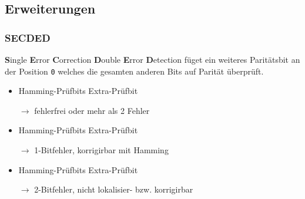 \example
{}

\subsection{Erweiterungen}
\subsubsection*{SECDED}
\textbf{S}ingle \textbf{E}rror \textbf{C}orrection \textbf{D}ouble \textbf{E}rror 
\textbf{D}etection füget ein weiteres Paritätsbit an der Position \texttt{0} welches
die gesamten anderen Bits auf Parität überprüft. \par
\begin{itemize}
    \item Hamming-Prüfbits \cmark \quad Extra-Prüfbit \cmark\par
    $\longrightarrow$ fehlerfrei oder mehr als 2 Fehler
    \item Hamming-Prüfbits \xmark \quad Extra-Prüfbit \xmark\par
    $\longrightarrow$ 1-Bitfehler, korrigirbar mit Hamming
    \item Hamming-Prüfbits \xmark \quad Extra-Prüfbit \cmark\par
    $\longrightarrow$ 2-Bitfehler, nicht lokalisier- bzw. korrigirbar
\end{itemize}
